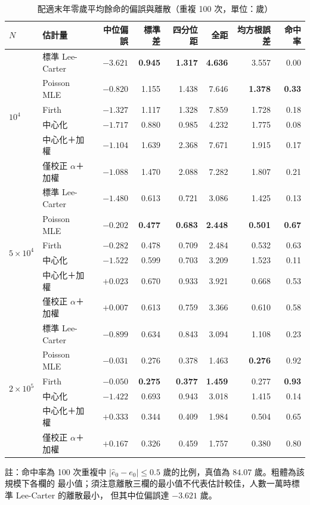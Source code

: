 \documentclass[UTF8, fontset=macnew, a4paper, 12pt]{ctexart}
\begin{document}
\begin{table}[H]
\centering
\caption{配適末年零歲平均餘命的偏誤與離散（重複 100 次，單位：歲）}
\small
\renewcommand{\arraystretch}{1.1}
\begin{tabular}{llrrrrrr}
\toprule
$N$ & 估計量 & 中位偏誤 & 標準差 & 四分位距 & 全距 & 均方根誤差 & 命中率\\
\midrule
\multirow{6}{*}{$10^4$}
 & 標準 Lee-Carter             & $-3.621$ & \textbf{0.945} & \textbf{1.317} & \textbf{4.636} & 3.557 & 0.00\\
 & Poisson MLE          & \textbf{$-0.820$} & 1.155 & 1.438 & 7.646 & \textbf{1.378} & \textbf{0.33}\\
 & Firth               & $-1.327$ & 1.117 & 1.328 & 7.859 & 1.728 & 0.18\\
 & 中心化              & $-1.717$ & 0.880 & 0.985 & 4.232 & 1.775 & 0.08\\
 & 中心化＋加權        & $-1.104$ & 1.639 & 2.368 & 7.671 & 1.915 & 0.17\\
 & 僅校正 $\alpha$＋加權 & $-1.088$ & 1.470 & 2.088 & 7.282 & 1.807 & 0.21\\
\midrule
\multirow{6}{*}{$5\times10^4$}
 & 標準 Lee-Carter             & $-1.480$ & 0.613 & 0.721 & 3.086 & 1.425 & 0.13\\
 & Poisson MLE          & $-0.202$ & \textbf{0.477} & \textbf{0.683} & \textbf{2.448} & \textbf{0.501} & \textbf{0.67}\\
 & Firth               & $-0.282$ & 0.478 & 0.709 & 2.484 & 0.532 & 0.63\\
 & 中心化              & $-1.522$ & 0.599 & 0.703 & 3.209 & 1.523 & 0.11\\
 & 中心化＋加權        & $+0.023$ & 0.670 & 0.933 & 3.921 & 0.668 & 0.53\\
 & 僅校正 $\alpha$＋加權 & \textbf{$+0.007$} & 0.613 & 0.759 & 3.366 & 0.610 & 0.58\\
\midrule
\multirow{6}{*}{$2\times10^5$}
 & 標準 Lee-Carter             & $-0.899$ & 0.634 & 0.843 & 3.094 & 1.108 & 0.23\\
 & Poisson MLE          & \textbf{$-0.031$} & 0.276 & 0.378 & 1.463 & \textbf{0.276} & 0.92\\
 & Firth               & $-0.050$ & \textbf{0.275} & \textbf{0.377} & \textbf{1.459} & 0.277 & \textbf{0.93}\\
 & 中心化              & $-1.422$ & 0.693 & 0.943 & 3.018 & 1.415 & 0.14\\
 & 中心化＋加權        & $+0.333$ & 0.344 & 0.409 & 1.984 & 0.504 & 0.65\\
 & 僅校正 $\alpha$＋加權 & $+0.167$ & 0.326 & 0.459 & 1.757 & 0.380 & 0.80\\
\bottomrule
\end{tabular}

\vspace{2pt}
\parbox{0.92\textwidth}{\footnotesize 註：命中率為 100 次重複中
$|\hat e_0-e_0|\le0.5$ 歲的比例，真值為 $84.07$ 歲。粗體為該規模下各欄的
最小值；須注意離散三欄的最小值不代表估計較佳，人數一萬時標準 Lee-Carter 的離散最小，
但其中位偏誤達 $-3.621$ 歲。}
\label{tab:e0var}
\end{table}
\end{document}
